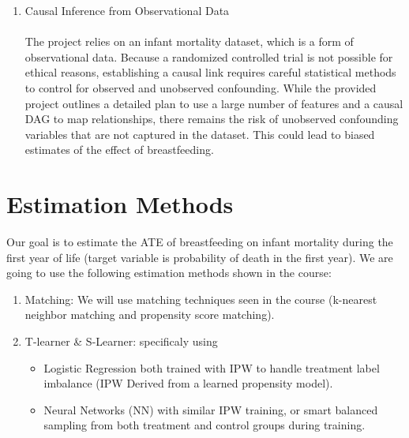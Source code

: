 \documentclass[a4paper,12pt]{article} %
\begin{document}
\begin{enumerate}
    \item Causal Inference from Observational Data\\\\
    The project relies on an infant mortality dataset, which is a form of observational data. Because a randomized controlled trial is not possible for ethical reasons, establishing a causal link requires careful statistical methods to control for observed and unobserved confounding. While the provided project outlines a detailed plan to use a large number of features and a causal DAG to map relationships, there remains the risk of unobserved confounding variables that are not captured in the dataset. This could lead to biased estimates of the effect of breastfeeding.

\end{enumerate}

\section{Estimation Methods}
Our goal is to estimate the ATE of breastfeeding on infant mortality during the first year of life (target variable is probability of death in the first year).
We are going to use the following estimation methods shown in the course:
\begin{enumerate}
    \item Matching: We will use matching techniques seen in the course (k-nearest neighbor matching and propensity score matching).
    \item T-learner \& S-Learner: specificaly using 
    \begin{itemize}
        \item  Logistic Regression both trained with IPW to handle treatment label imbalance (IPW Derived from a learned propensity model).
        \item  Neural Networks (NN) with similar IPW training, or smart balanced sampling from both treatment and control groups during training.
    \end{itemize}
   
\end{enumerate}
\end{document}

